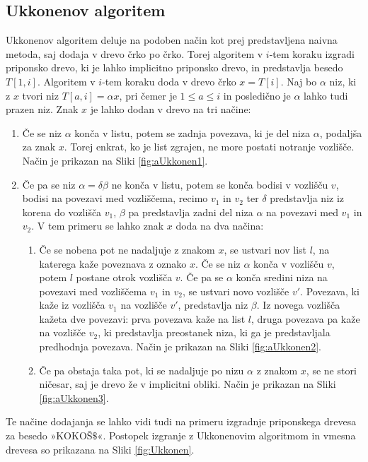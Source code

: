 \subsection{Ukkonenov algoritem}
Ukkonenov algoritem deluje na podoben način kot prej predstavljena naivna metoda, saj dodaja v drevo črko po črko. Torej algoritem v $i$-tem koraku izgradi priponsko drevo, ki je lahko implicitno priponsko drevo, in predstavlja besedo $T[1,i]$. Algoritem v $i$-tem koraku doda v drevo črko $x=T[i]$. Naj bo $\alpha$ niz, ki z $x$ tvori niz $T[a,i]=\alpha x$, pri čemer je $1\le a \le i $ in posledično je $\alpha$ lahko tudi prazen niz. Znak $x$ je lahko dodan v drevo na tri načine:
\begin{enumerate}
    \item Če se niz $\alpha$ konča v listu, potem se zadnja povezava, ki je del niza $\alpha$, podaljša za znak $x$. Torej enkrat, ko je list zgrajen, ne more postati notranje vozlišče. Način je prikazan na Sliki \ref{fig:aUkkonen1}.
    \item Če pa se niz $\alpha=\delta\beta$ ne konča v listu, potem se konča bodisi v vozlišču $v$, bodisi na povezavi med vozliščema, recimo $v_1$ in $v_2$ ter $\delta$ predstavlja niz iz korena do vozlišča $v_1$, $\beta$ pa predstavlja zadni del niza $\alpha$ na povezavi med $v_1$ in $v_2$. V tem primeru se lahko znak $x$ doda na dva načina:
    \begin{enumerate}
        \item \label{enum:dodajanje2} Če se nobena pot ne nadaljuje z znakom $x$, se ustvari nov list $l$, na katerega kaže poveznava z oznako $x$. Če se niz $\alpha$ konča v vozlišču $v$, potem $l$ postane otrok vozlišča $v$. Če pa se $\alpha$ konča sredini niza na povezavi med vozliščema $v_1$ in $v_2$, se ustvari novo vozlišče $v'$. Povezava, ki kaže iz vozlišča $v_1$ na vozlišče $v'$, predstavlja niz $\beta$. Iz novega vozlišča kažeta dve povezavi: prva povezava kaže na list $l$, druga povezava pa kaže na vozlišče $v_2$, ki predstavlja preostanek niza, ki ga je predstavljala predhodnja povezava. Način je prikazan na Sliki \ref{fig:aUkkonen2}.
        \item \label{enum:dodajanje3} Če pa obstaja taka pot, ki se nadaljuje po nizu $\alpha$ z znakom $x$, se ne stori ničesar, saj je drevo že v implicitni obliki. Način je prikazan na Sliki \ref{fig:aUkkonen3}.
    \end{enumerate}    
\end{enumerate}
Te načine dodajanja se lahko vidi tudi na primeru izgradnje priponskega drevesa za besedo »KOKOŠ$\$$«. Postopek izgranje z Ukkonenovim algoritmom in vmesna drevesa so prikazana na Sliki \ref{fig:Ukkonen}.

